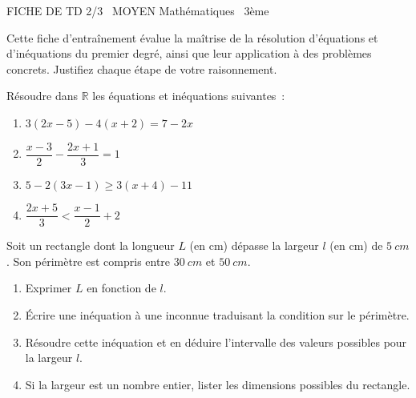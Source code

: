 \documentclass[11pt]{article}
\begin{document}
\begin{tcolorbox}[enhanced,colback=popink,colframe=popink,arc=10pt,boxrule=0pt,left=12pt,right=12pt,top=9pt,bottom=9pt]
{\color{white}\popxbold\small FICHE DE TD 2/3 \textbullet\ MOYEN \hfill Mathématiques \textbullet\ 3ème\par}
\end{tcolorbox}
\vspace{4pt}
\noindent Cette fiche d'entraînement évalue la maîtrise de la résolution d'équations et d'inéquations du premier degré, ainsi que leur application à des problèmes concrets. Justifiez chaque étape de votre raisonnement.

\begin{exercice}
Résoudre dans $\mathbb{R}$ les équations et inéquations suivantes~:
\begin{enumerate}
    \item $3(2x - 5) - 4(x + 2) = 7 - 2x$
    \item $\dfrac{x - 3}{2} - \dfrac{2x + 1}{3} = 1$
    \item $5 - 2(3x - 1) \geqslant 3(x + 4) - 11$
    \item $\dfrac{2x + 5}{3} < \dfrac{x - 1}{2} + 2$
\end{enumerate}
\end{exercice}

\begin{exercice}
Soit un rectangle dont la longueur $L$ (en cm) dépasse la largeur $l$ (en cm) de $\SI{5}{cm}$. Son périmètre est compris entre $\SI{30}{cm}$ et $\SI{50}{cm}$.
\begin{enumerate}
    \item Exprimer $L$ en fonction de $l$.
    \item Écrire une inéquation à une inconnue traduisant la condition sur le périmètre.
    \item Résoudre cette inéquation et en déduire l'intervalle des valeurs possibles pour la largeur $l$.
    \item Si la largeur est un nombre entier, lister les dimensions possibles du rectangle.
\end{enumerate}
\end{exercice}
\end{document}
